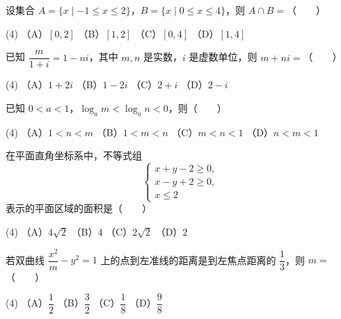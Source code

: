 \begin{question}
设集合 $A=\{x\mid -1\leqslant x\leqslant2\}$，$B=\{x\mid 0\leqslant x\leqslant4\}$，则 $A\cap B=$\mbox{（　　）}

\begin{gkopts}(4)
\task （A）$[0,2]$
\task （B）$[1,2]$
\task （C）$[0,4]$
\task （D）$[1,4]$
\end{gkopts}

\end{question}
\begin{question}
已知 $\dfrac{m}{1+i}=1-ni$，其中 $m,n$ 是实数，$i$ 是虚数单位，则 $m+ni=$\mbox{（　　）}

\begin{gkopts}(4)
\task （A）$1+2i$
\task （B）$1-2i$
\task （C）$2+i$
\task （D）$2-i$
\end{gkopts}

\end{question}
\begin{question}
已知 $0<a<1$，$\log_a m<\log_a n<0$，则\mbox{（　　）}

\begin{gkopts}(4)
\task （A）$1<n<m$
\task （B）$1<m<n$
\task （C）$m<n<1$
\task （D）$n<m<1$
\end{gkopts}

\end{question}
\begin{question}
在平面直角坐标系中，不等式组
\nopagebreak[4]
\[
\begin{cases}
x+y-2\geqslant0,\\
x-y+2\geqslant0,\\
x\leqslant2
\end{cases}
\]
表示的平面区域的面积是\mbox{（　　）}

\begin{gkopts}(4)
\task （A）$4\sqrt2$
\task （B）$4$
\task （C）$2\sqrt2$
\task （D）$2$
\end{gkopts}

\end{question}
\begin{question}
若双曲线 $\dfrac{x^2}{m}-y^2=1$ 上的点到左准线的距离是到左焦点距离的 $\dfrac13$，则 $m=$\mbox{（　　）}

\begin{gkopts}(4)
\task （A）$\dfrac12$
\task （B）$\dfrac32$
\task （C）$\dfrac18$
\task （D）$\dfrac98$
\end{gkopts}

\end{question}

